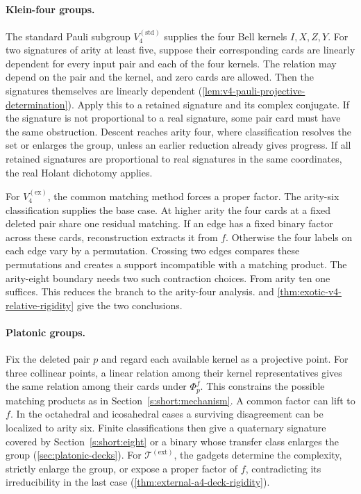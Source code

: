\documentclass[11pt,letterpaper,onecolumn]{article}
\theoremstyle{plain}
\theoremstyle{definition}
\theoremstyle{remark}
\newcommand{\KleinStd}{{V_4^{(\mathrm{std})}}}
\newcommand{\KleinEx}{{V_4^{(\mathrm{ex})}}}
\newcommand{\TetExt}{{\mathcal T^{(\mathrm{ext})}}}
\begin{document}
\paragraph{Klein-four groups.}
The standard Pauli subgroup \(\KleinStd\) supplies the four Bell kernels \(I,X,Z,Y\).
For two signatures of arity at least five, suppose their corresponding
cards are linearly dependent for every input pair and each of the four
kernels. The relation may depend on the pair and the kernel, and zero
cards are allowed. Then the signatures themselves are linearly dependent
(\cref{lem:v4-pauli-projective-determination}). Apply
this to a retained signature and its complex conjugate. If the
signature is not proportional to a real signature, some pair card
must have the same obstruction. Descent reaches arity four, where
classification resolves the set or enlarges the group, unless an
earlier reduction already gives progress. If all retained signatures
are proportional to real signatures in the same coordinates, the real
Holant dichotomy \cite{ShaoCai2020} applies.

For \(\KleinEx\), the common matching method
forces a proper factor. The arity-six classification supplies the
base case. At higher arity the four cards at a fixed deleted pair share
one residual matching. If an edge has a fixed binary factor across
these cards, reconstruction extracts it from \(f\). Otherwise the
four labels on each edge vary by a permutation. Crossing two edges
compares these permutations and creates a support incompatible with
a matching product. The arity-eight boundary needs two such contraction
choices. From arity ten one suffices. This reduces the branch to the
arity-four analysis. 
and \cref{thm:exotic-v4-relative-rigidity} give the two conclusions.

\paragraph{Platonic groups.}
Fix the deleted pair \(p\) and regard each available kernel as a
projective point. For three collinear points, a linear relation among
their kernel representatives gives the same relation among their cards
under \(\Phi_p^f\). This constrains the possible matching products as in
Section~\ref{s:short:mechanism}. A common factor can lift to \(f\).
In the octahedral and icosahedral cases a surviving disagreement can
be localized to arity six. Finite classifications then give a quaternary
signature covered by Section~\ref{s:short:eight} or a binary whose transfer
class enlarges the group (\cref{sec:platonic-decks}).
For \(\TetExt\), the gadgets determine the complexity, strictly enlarge
the group, or expose a proper factor of \(f\), contradicting its
irreducibility in the last case (\cref{thm:external-a4-deck-rigidity}).
\end{document}
